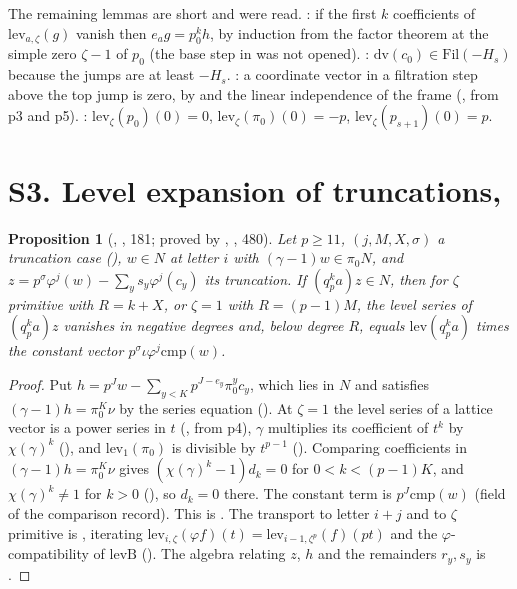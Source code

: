 \documentclass[11pt]{article}
\newcommand{\Fil}{\mathrm{Fil}}
\newtheorem{prop}[lemma]{Proposition}
\theoremstyle{definition}
\theoremstyle{remark}
\begin{document}
The remaining lemmas are short and were read. : if the first $k$ coefficients of $\mathrm{lev}_{a,\zeta}(g)$ vanish then $e_ag=p_0^kh$, by induction from the factor theorem at the simple zero $\zeta-1$ of $p_0$ (the base step  in  was not opened). : $\mathrm{dv}(c_0)\in\Fil(-H_s)$ because the jumps are at least $-H_s$. : a coordinate vector in a filtration step above the top jump is zero, by  and the linear independence of the frame (, from p3 and p5). : $\mathrm{lev}_\zeta(p_0)(0)=0$, $\mathrm{lev}_\zeta(\pi_0)(0)=-p$, $\mathrm{lev}_\zeta(p_{s+1})(0)=p$.

\section{S3. Level expansion of truncations, \texorpdfstring{}{THor}}\label{sec:thor}

\begin{prop}[, , 181; proved by , , 480]\label{prop:thor}
Let $p\ge11$, $(j,M,X,\sigma)$ a truncation case (), $w\in N$ at letter $i$ with $(\gamma-1)w\in\pi_0N$, and $z=p^\sigma\varphi^j(w)-\sum_ys_y\varphi^j(c_y)$ its truncation. If $(q_p^ka)z\in N$, then for $\zeta$ primitive with $R=k+X$, or $\zeta=1$ with $R=(p-1)M$, the level series of $(q_p^ka)z$ vanishes in negative degrees and, below degree $R$, equals $\mathrm{lev}(q_p^ka)$ times the constant vector $p^\sigma\iota\varphi^j\mathrm{cmp}(w)$.
\end{prop}

\begin{proof}
Put $h=p^Jw-\sum_{y<K}p^{J-e_y}\pi_0^yc_y$, which lies in $N$ and satisfies $(\gamma-1)h=\pi_0^K\nu$ by the series equation (). At $\zeta=1$ the level series of a lattice vector is a power series in $t$ (, from p4), $\gamma$ multiplies its coefficient of $t^k$ by $\chi(\gamma)^k$ (), and $\mathrm{lev}_1(\pi_0)$ is divisible by $t^{p-1}$ (). Comparing coefficients in $(\gamma-1)h=\pi_0^K\nu$ gives $(\chi(\gamma)^k-1)d_k=0$ for $0<k<(p-1)K$, and $\chi(\gamma)^k\ne1$ for $k>0$ (), so $d_k=0$ there. The constant term is $p^J\mathrm{cmp}(w)$ (field  of the comparison record). This is . The transport to letter $i+j$ and to $\zeta$ primitive is , iterating $\mathrm{lev}_{i,\zeta}(\varphi f)(t)=\mathrm{lev}_{i-1,\zeta^p}(f)(pt)$ and the $\varphi$-compatibility of $\mathrm{levB}$ (). The algebra relating $z$, $h$ and the remainders $r_y,s_y$ is .
\end{proof}
\end{document}
